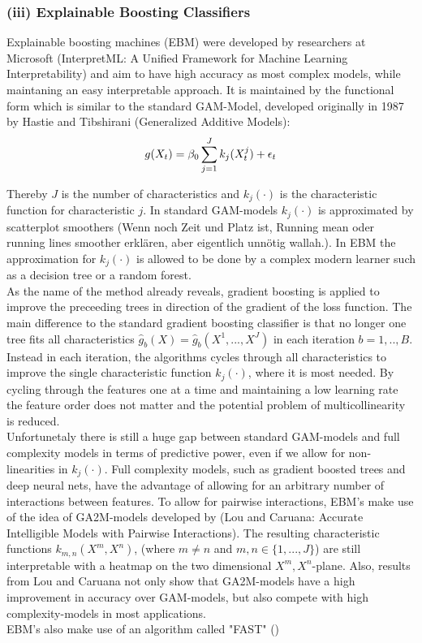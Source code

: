 \documentclass[12pt,titlepage]{article}
\begin{document}
\subsubsection*{(iii) Explainable Boosting Classifiers}

Explainable boosting machines (EBM) were developed by researchers at Microsoft (InterpretML: A Unified Framework for Machine Learning Interpretability) and aim to have high accuracy as most complex models, while maintaning an easy interpretable approach. It is maintained by the functional form which is similar to the standard GAM-Model, developed originally in 1987 by Hastie and Tibshirani (Generalized Additive Models): \\

\begin{equation} \label{gam}
    g(X_{t}) = \beta_{0} \sum_{j=1}^{J} k_{j}(X^{j}_{t}) + \epsilon_{t} \\
\end{equation}

Thereby $J$ is the number of characteristics and $k_{j}(\cdot)$ is the characteristic function for characteristic $j$. In standard GAM-models $k_{j}(\cdot)$ is approximated by scatterplot smoothers (Wenn noch Zeit und Platz ist, Running mean oder running lines smoother erklären, aber eigentlich unnötig wallah.). In EBM the approximation for $k_{j}(\cdot)$ is allowed to be done by a complex modern learner such as a decision tree or a random forest. \\
As the name of the method already reveals, gradient boosting is applied to improve the preceeding trees in direction of the gradient of the loss function. The main difference to the standard gradient boosting classifier is that no longer one tree fits all characteristics $\hat{g}_{b}(X)=\hat{g}_{b}(X^{1}, ..., X^{J})$ in each iteration $b=1,..,B$. Instead in each iteration, the algorithms cycles through all characteristics to improve the single characteristic function $k_{j}(\cdot)$, where it is most needed. By cycling through the features one at a time and maintaining a low learning rate the feature order does not matter and the potential problem of multicollinearity is reduced. \\
Unfortunetaly there is still a huge gap between standard GAM-models and full complexity models in terms of predictive power, even if we allow for non-linearities in $k_{j}(\cdot)$. Full complexity models, such as gradient boosted trees and deep neural nets, have the advantage of allowing for an arbitrary number of interactions between features. To allow for pairwise interactions, EBM's make use of the idea of GA2M-models developed by (Lou and Caruana: Accurate Intelligible Models with Pairwise Interactions). The resulting characteristic functions $k_{m,n}(X^{m}, X^{n})$, (where $m\neq n$ and $m,n \in \{1,...,J\}$) are still interpretable with a heatmap on the two dimensional $X^{m}, X^{n}$-plane. Also, results from Lou and Caruana not only show that GA2M-models have a high improvement in accuracy over GAM-models, but also compete with high complexity-models in most applications. \\
EBM's also make use of an algorithm called "FAST" ()
\end{document}
